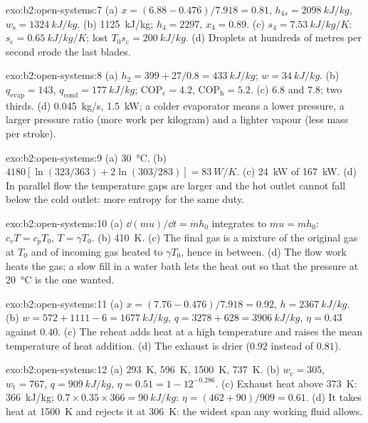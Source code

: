 \begin{solution}{exo:b2:open-systems:7}
(a) $x = (6.88 - 0.476)/7.918 = 0.81$, $h_{4s} = \qty{2098}{kJ/kg}$, $w_{\text{s}} =
\qty{1324}{kJ/kg}$. (b) \qty{1125}{kJ/kg}; $h_4 = 2297$, $x_4 = 0.89$. (c) $s_4 =
\qty{7.53}{kJ/kg/K}$: $s_{\text{c}} = \qty{0.65}{kJ/kg/K}$; lost $T_0s_{\text{c}} =
\qty{200}{kJ/kg}$. (d) Droplets at hundreds of metres per second erode the
last blades.
\end{solution}

\begin{solution}{exo:b2:open-systems:8}
(a) $h_2 = 399 + 27/0.8 = \qty{433}{kJ/kg}$; $w = \qty{34}{kJ/kg}$. (b) $q_{\text{evap}}
= 143$, $q_{\text{cond}} = \qty{177}{kJ/kg}$; $\mathrm{COP}_{\text{c}} = 4.2$,
$\mathrm{COP}_{\text{h}} = 5.2$. (c) $6.8$ and $7.8$; two thirds. (d) \qty{0.045}{kg/s},
\qty{1.5}{kW}; a colder evaporator means a lower pressure, a larger
pressure ratio (more work per kilogram) and a lighter vapour (less
mass per stroke).
\end{solution}

\begin{solution}{exo:b2:open-systems:9}
(a) \qty{30}{\celsius}. (b) $4180[\ln(323/363) + 2\ln(303/283)] = \qty{83}{W/K}$.
(c) \qty{24}{kW} of \qty{167}{kW}. (d) In parallel flow the temperature gaps are
larger and the hot outlet cannot fall below the cold outlet: more
entropy for the same duty.
\end{solution}

\begin{solution}{exo:b2:open-systems:10}
(a) $\dd(mu)/\dd t = \dot m h_0$ integrates to $mu = mh_0$: $c_vT = c_pT_0$,
$T = \gamma T_0$. (b) \qty{410}{K}. (c) The final gas is a mixture of the
original gas at $T_0$ and of incoming gas heated to $\gamma T_0$, hence
in between. (d) The flow work heats the gas; a slow fill in a water
bath lets the heat out so that the pressure at \qty{20}{\celsius} is the
one wanted.
\end{solution}

\begin{solution}{exo:b2:open-systems:11}
(a) $x = (7.76 - 0.476)/7.918 = 0.92$, $h = \qty{2367}{kJ/kg}$. (b) $w = 572 + 1111
- 6 = \qty{1677}{kJ/kg}$, $q = 3278 + 628 = \qty{3906}{kJ/kg}$, $\eta = 0.43$
against $0.40$. (c) The reheat adds heat at a high temperature and
raises the mean temperature of heat addition. (d) The exhaust is drier
($0.92$ instead of $0.81$).
\end{solution}

\begin{solution}{exo:b2:open-systems:12}
(a) \qty{293}{K}, \qty{596}{K}, \qty{1500}{K}, \qty{737}{K}. (b) $w_{\text{c}} = 305$,
$w_{\text{t}} = 767$, $q = \qty{909}{kJ/kg}$, $\eta = 0.51 = 1 - 12^{-0.286}$. (c)
Exhaust heat above \qty{373}{K}: \qty{366}{kJ/kg}; $0.7 \times 0.35 \times 366 =
\qty{90}{kJ/kg}$: $\eta = (462 + 90)/909 = 0.61$. (d) It takes heat at
\qty{1500}{K} and rejects it at \qty{306}{K}: the widest span any working
fluid allows.
\end{solution}

